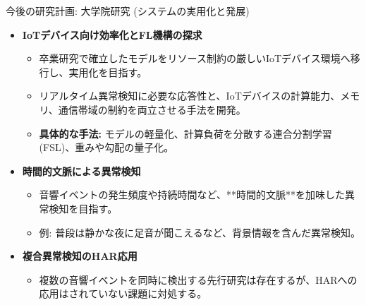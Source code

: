 \documentclass[unicode,12pt,aspectratio=169, dvipdfmx]{beamer}
\begin{document}
\begin{frame}{今後の研究計画: 大学院研究 (システムの実用化と発展)}
\begin{itemize}
    \item \textbf{IoTデバイス向け効率化とFL機構の探求}
    \begin{itemize}
        \item 卒業研究で確立したモデルをリソース制約の厳しいIoTデバイス環境へ移行し、実用化を目指す。
        \item リアルタイム異常検知に必要な応答性と、IoTデバイスの計算能力、メモリ、通信帯域の制約を両立させる手法を開発。
        \item \textbf{具体的な手法:} モデルの軽量化、計算負荷を分散する連合分割学習 (FSL)、重みや勾配の量子化。
    \end{itemize}
    \item \textbf{時間的文脈による異常検知}
    \begin{itemize}
        \item 音響イベントの発生頻度や持続時間など、**時間的文脈**を加味した異常検知を目指す。
        \item 例: 普段は静かな夜に足音が聞こえるなど、背景情報を含んだ異常検知。
    \end{itemize}
    \item \textbf{複合異常検知のHAR応用}
    \begin{itemize}
        \item 複数の音響イベントを同時に検出する先行研究は存在するが、HARへの応用はされていない課題に対処する。
    \end{itemize}
\end{itemize}
\end{frame}
\end{document}
